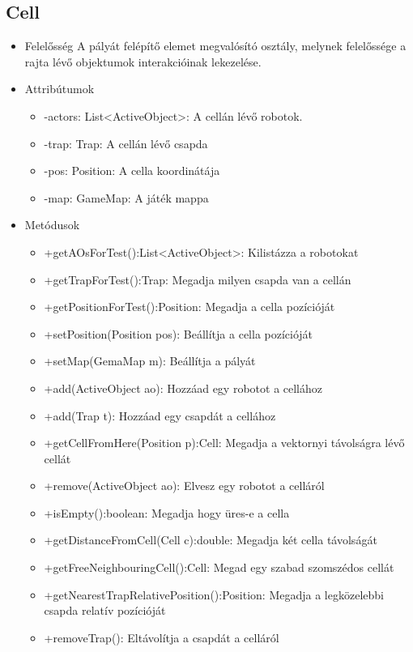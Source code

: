 \subsection{Cell}
\begin{itemize}
	\item Felelősség\newline
	A pályát felépítő elemet megvalósító osztály, melynek felelőssége a rajta lévő objektumok interakcióinak lekezelése.
	\item Attribútumok\newline
	\begin{itemize}
		\item -actors: List<ActiveObject>: A cellán lévő robotok.
		\item -trap: Trap: A cellán lévő csapda
		\item -pos: Position: A cella koordinátája
		\item -map: GameMap: A játék mappa
	\end{itemize}
	\item Metódusok\newline
	\begin{itemize}
		\item +getAOsForTest():List<ActiveObject>: Kilistázza a robotokat
		\item +getTrapForTest():Trap: Megadja milyen csapda van a cellán
		\item +getPositionForTest():Position: Megadja a cella pozícióját
		\item +setPosition(Position pos): Beállítja a cella pozícióját
		\item +setMap(GemaMap m): Beállítja a pályát
		\item +add(ActiveObject ao): Hozzáad egy robotot a cellához
		\item +add(Trap t): Hozzáad egy csapdát a cellához
		\item +getCellFromHere(Position p):Cell: Megadja a vektornyi távolságra lévő cellát
		\item +remove(ActiveObject ao): Elvesz egy robotot a celláról
		\item +isEmpty():boolean: Megadja hogy üres-e a cella
		\item +getDistanceFromCell(Cell c):double: Megadja két cella távolságát
		\item +getFreeNeighbouringCell():Cell: Megad egy szabad szomszédos cellát
		\item +getNearestTrapRelativePosition():Position: Megadja a legközelebbi csapda relatív pozícióját
		\item +removeTrap(): Eltávolítja a csapdát a celláról
	\end{itemize}
\end{itemize}

